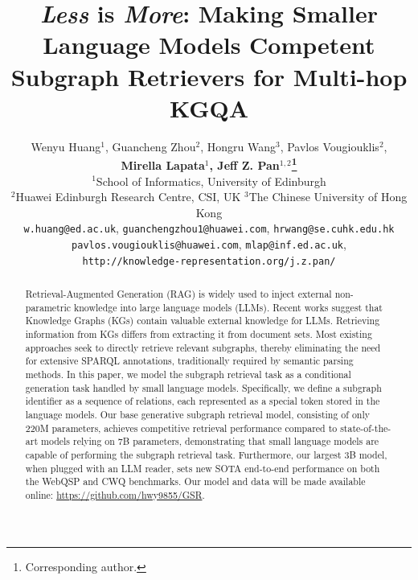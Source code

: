 \documentclass[11pt]{article}
\title{\emph{Less} is \emph{More}: Making Smaller Language Models  Competent Subgraph Retrievers for Multi-hop KGQA}
\author{
  Wenyu Huang$^{1}$,
  Guancheng Zhou$^{2}$,
  Hongru Wang$^{3}$, 
  Pavlos Vougiouklis$^{2}$, \\
  \textbf{Mirella Lapata$^{1}$, 
  Jeff Z. Pan$^{1,2}$\thanks{Corresponding author.}} \\
  $^1$School of Informatics, University of Edinburgh \\ 
  $^2$Huawei Edinburgh Research Centre, CSI, UK 
  $^3$The Chinese University of Hong Kong \\\texttt{w.huang@ed.ac.uk}, \texttt{guanchengzhou1@huawei.com}, \texttt{hrwang@se.cuhk.edu.hk}\\\texttt{pavlos.vougiouklis@huawei.com}, \texttt{mlap@inf.ed.ac.uk}, \\\texttt{http://knowledge-representation.org/j.z.pan/}
}
\begin{document}
\maketitle
\begin{abstract}
Retrieval-Augmented Generation (RAG) is widely used to inject external non-parametric knowledge into large language models (LLMs). Recent works suggest that Knowledge Graphs (KGs) contain valuable external knowledge for LLMs. Retrieving information from KGs differs from extracting it from document sets. Most existing approaches seek to directly retrieve relevant subgraphs, thereby eliminating the need for extensive SPARQL annotations, traditionally required by semantic parsing methods. In this paper, we model the subgraph retrieval task as a conditional generation task handled by small language models. Specifically, we define a subgraph identifier as a sequence of relations, each represented as a special token stored in the language models. Our base generative subgraph retrieval model, consisting of only 220M parameters, achieves competitive retrieval performance compared to state-of-the-art models relying on 7B parameters, demonstrating that small language models are capable of performing the subgraph retrieval task. Furthermore, our largest 3B model, when plugged with an LLM reader, sets new SOTA end-to-end performance on both the WebQSP and CWQ benchmarks. Our model and data will be made available online: \url{https://github.com/hwy9855/GSR}.


\end{abstract}
\end{document}
